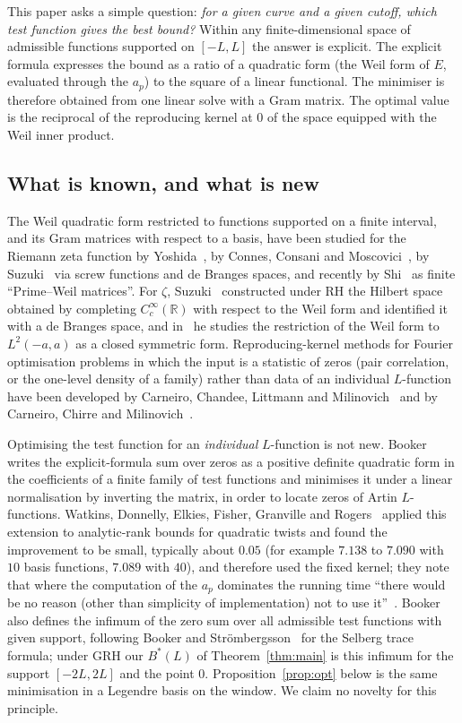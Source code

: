 \documentclass[11pt]{amsart}
\renewcommand{\S}{\ensuremath{\mathsection}}
\theoremstyle{remark}
\theoremstyle{definition}
\newcommand{\R}{\mathbb{R}}
\begin{document}
This paper asks a simple question: \emph{for a given curve and a given cutoff, which test function gives the best bound?} Within any finite-dimensional space of admissible functions supported on $[-L,L]$ the answer is explicit. The explicit formula expresses the bound as a ratio of a quadratic form (the Weil form of $E$, evaluated through the $a_p$) to the square of a linear functional. The minimiser is therefore obtained from one linear solve with a Gram matrix. The optimal value is the reciprocal of the reproducing kernel at $0$ of the space equipped with the Weil inner product.

\subsection*{What is known, and what is new}
The Weil quadratic form restricted to functions supported on a finite interval, and its Gram matrices with respect to a basis, have been studied for the Riemann zeta function by Yoshida~\cite{Yoshida}, by Connes, Consani and Moscovici~\cite{CCM}, by Suzuki~\cite{Suzuki} via screw functions and de Branges spaces, and recently by Shi~\cite{Shi} as finite ``Prime--Weil matrices''. For $\zeta$, Suzuki~\cite{SuzukiCJM} constructed under RH the Hilbert space obtained by completing $C_c^\infty(\R)$ with respect to the Weil form and identified it with a de Branges space, and in~\cite{Suzuki} he studies the restriction of the Weil form to $L^2(-a,a)$ as a closed symmetric form. Reproducing-kernel methods for Fourier optimisation problems in which the input is a statistic of zeros (pair correlation, or the one-level density of a family) rather than data of an individual $L$-function have been developed by Carneiro, Chandee, Littmann and Milinovich~\cite{CCLM} and by Carneiro, Chirre and Milinovich~\cite{CCMil}.

Optimising the test function for an \emph{individual} $L$-function is not new. Booker~\cite[\S3]{Booker} writes the explicit-formula sum over zeros as a positive definite quadratic form in the coefficients of a finite family of test functions and minimises it under a linear normalisation by inverting the matrix, in order to locate zeros of Artin $L$-functions. Watkins, Donnelly, Elkies, Fisher, Granville and Rogers~\cite[\S7]{Watkins} applied this extension to analytic-rank bounds for quadratic twists and found the improvement to be small, typically about $0.05$ (for example $7.138$ to $7.090$ with $10$ basis functions, $7.089$ with $40$), and therefore used the fixed kernel; they note that where the computation of the $a_p$ dominates the running time ``there would be no reason (other than simplicity of implementation) not to use it''~\cite[p.~75]{Watkins}. Booker~\cite[\S3, (3.3)]{Booker} also defines the infimum of the zero sum over all admissible test functions with given support, following Booker and Str\"ombergsson~\cite{BS} for the Selberg trace formula; under GRH our $B^*(L)$ of Theorem~\ref{thm:main} is this infimum for the support $[-2L,2L]$ and the point $0$. Proposition~\ref{prop:opt} below is the same minimisation in a Legendre basis on the window. We claim no novelty for this principle.
\end{document}
